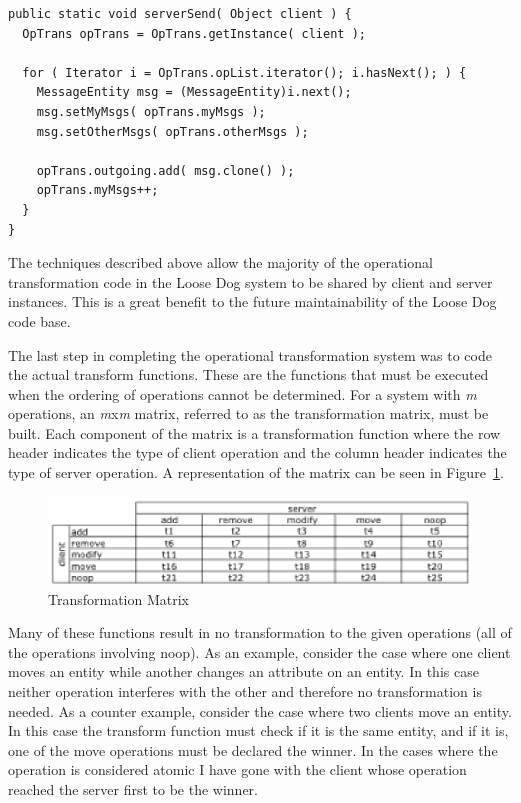 \documentclass{article}
\begin{document}
\begin{verbatim}
public static void serverSend( Object client ) {
  OpTrans opTrans = OpTrans.getInstance( client );

  for ( Iterator i = OpTrans.opList.iterator(); i.hasNext(); ) {
    MessageEntity msg = (MessageEntity)i.next();
    msg.setMyMsgs( opTrans.myMsgs );
    msg.setOtherMsgs( opTrans.otherMsgs );

    opTrans.outgoing.add( msg.clone() );
    opTrans.myMsgs++;
  }
}
\end{verbatim}

The techniques described above allow the majority of the operational
transformation code in the Loose Dog system to be shared by client and
server instances.  This is a great benefit to the future
maintainability of the Loose Dog code base.

The last step in completing the operational transformation system was
to code the actual transform functions.  These are the functions that
must be executed when the ordering of operations cannot be
determined.  For a system with \emph{m} operations, an
\emph{m}x\emph{m} matrix, referred to as the transformation matrix,
must be built.  Each component of the matrix is a transformation
function where the row header indicates the type of client operation
and the column header indicates the type of server operation.  A
representation of the matrix can be seen in Figure~\ref{matrix}.

\begin{figure}[!h]
\begin{center}
\includegraphics{matrix.eps}
\caption{Transformation Matrix} \label{matrix}
\end{center}
\end{figure}

Many of these functions result in no transformation to
the given operations (all of the operations involving noop).
As an example, consider the case where one
client moves an entity while another changes an attribute on an
entity.  In this case neither operation interferes with the other and
therefore no transformation is needed.  As a counter example, consider
the case where two clients move an entity.  In this case the transform
function must check if it is the same entity, and if it is, one of the
move operations must be declared the winner.  In the cases where the
operation is considered atomic I have gone with the client whose
operation reached the server first to be the winner.
\end{document}
